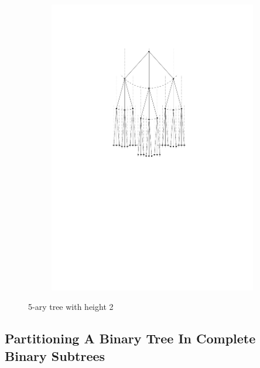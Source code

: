 \begin{figure}[H]
	\centering
	\begin{subfigure}{\textwidth}
		\centering
		\includegraphics[page=2,width=0.8\linewidth]{graphics/k-ary_tree_example_drawings.pdf}
	\end{subfigure}
	\caption{5-ary tree with height 2}\label{im:4-ary_tree}
\end{figure}


\subsection{Partitioning A Binary Tree In Complete Binary Subtrees}

